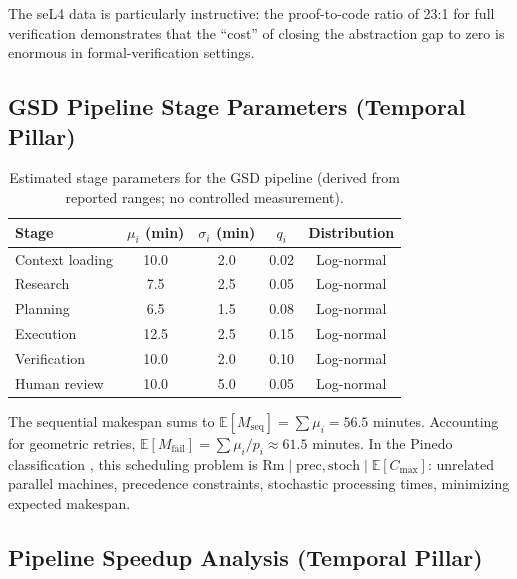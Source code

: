 \documentclass[11pt, a4paper, logo, copyright]{googledeepmind}
\newcommand{\E}{\mathbb{E}}
\begin{document}
\begin{appendices}
The seL4 data is particularly instructive: the proof-to-code ratio of 23:1
for full verification demonstrates that the ``cost'' of closing the abstraction
gap to zero is enormous in formal-verification settings.


\subsection{GSD Pipeline Stage Parameters (Temporal Pillar)}
\label{app:gsd-params}

\begin{table}[htbp]
\centering
\caption{Estimated stage parameters for the GSD pipeline (derived from reported ranges; no controlled measurement).}
\label{tab:ext-stages}
\begin{tabular}{lcccc}
\toprule
\textbf{Stage} & $\mu_i$ (min) & $\sigma_i$ (min) & $q_i$ & \textbf{Distribution} \\
\midrule
Context loading & 10.0 & 2.0 & 0.02 & Log-normal \\
Research & 7.5 & 2.5 & 0.05 & Log-normal \\
Planning & 6.5 & 1.5 & 0.08 & Log-normal \\
Execution & 12.5 & 2.5 & 0.15 & Log-normal \\
Verification & 10.0 & 2.0 & 0.10 & Log-normal \\
Human review & 10.0 & 5.0 & 0.05 & Log-normal \\
\bottomrule
\end{tabular}
\end{table}

The sequential makespan sums to $\E[M_{\mathrm{seq}}] = \sum \mu_i = 56.5$ minutes.
Accounting for geometric retries, $\E[M_{\mathrm{fail}}] = \sum \mu_i / p_i \approx 61.5$ minutes.
In the Pinedo classification \citep{pinedo2016scheduling}, this scheduling problem is
$\mathrm{Rm} \mid \mathrm{prec}, \mathrm{stoch} \mid \E[C_{\max}]$:
unrelated parallel machines, precedence constraints, stochastic processing times,
minimizing expected makespan.


\subsection{Pipeline Speedup Analysis (Temporal Pillar)}
\label{app:speedup}


\end{appendices}
\end{document}

